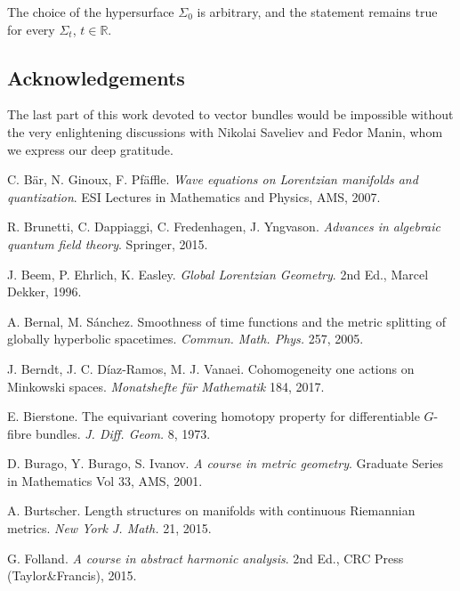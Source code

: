 \documentclass{article}
\begin{document}
\begin{remark} The choice of the hypersurface $\Sigma_0$ is arbitrary, and the statement remains true for every $\Sigma_t$, $t\in\mathbb{R}$.
\end{remark}

\subsection*{Acknowledgements}

The last part of this work devoted to vector bundles would be impossible without the very enlightening discussions with Nikolai Saveliev and Fedor Manin, whom we express our deep gratitude.

\begin{thebibliography}{5}

C. B\"ar, N. Ginoux, F. Pf\"affle.
\textit{Wave equations on Lorentzian manifolds and quantization}.
ESI Lectures in Mathematics and Physics, AMS, 2007.

R. Brunetti, C. Dappiaggi, C. Fredenhagen, J. Yngvason.
\textit{Advances in algebraic quantum field theory}.
Springer, 2015.

J. Beem, P. Ehrlich, K. Easley.
\textit{Global Lorentzian Geometry}.
2nd Ed., Marcel Dekker, 1996.

A. Bernal, M. S\'anchez.
Smoothness of time functions and the metric splitting of globally hyperbolic
spacetimes.
\textit{Commun. Math. Phys.} 257, 2005.

J. Berndt, J. C. D\'iaz-Ramos, M. J. Vanaei.
Cohomogeneity one actions on Minkowski spaces.
\textit{Monatshefte f\"ur Mathematik} 184, 2017.

E. Bierstone.
The equivariant covering homotopy property for differentiable $G$-fibre bundles.
\textit{J. Diff. Geom.} 8, 1973.

D. Burago, Y. Burago, S. Ivanov.
\textit{A course in metric geometry}.
Graduate Series in Mathematics Vol 33, AMS, 2001.

A. Burtscher.
Length structures on manifolds with
continuous Riemannian metrics.
\textit{New York J. Math.} 21, 2015.

G. Folland.
\textit{A course in abstract harmonic analysis}.
2nd Ed., CRC Press (Taylor\&Francis), 2015.


\end{thebibliography}
\end{document}
